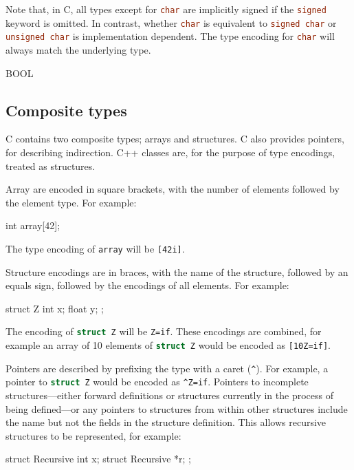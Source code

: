 \documentclass[a4paper]{report}
\newcommand{\ccode}[1]{\lstinline[language={C}]{#1}}
\begin{document}
Note that, in C, all types except for \ccode{char} are implicitly signed if the \ccode{signed} keyword is omitted.
In contrast, whether \ccode{char} is equivalent to \ccode{signed char} or \ccode{unsigned char} is implementation dependent.
The type encoding for \ccode{char} will always match the underlying type.

BOOL

\subsection{Composite types}

C contains two composite types; arrays and structures.
C also provides pointers, for describing indirection.
C++ classes are, for the purpose of type encodings, treated as structures.

Array are encoded in square brackets, with the number of elements followed by the element type.
For example:

\begin{codesnippet}
int array[42];
\end{codesnippet}

The type encoding of \ccode{array} will be \texttt{[42i]}.

Structure encodings are in braces, with the name of the structure, followed by an equals sign, followed by the encodings of all elements.
For example:

\begin{codesnippet}
struct Z
{
	int x;
	float y;
};
\end{codesnippet}

The encoding of \ccode{struct Z} will be \texttt{{Z=if}}.
These encodings are combined, for example an array of 10 elements of \ccode{struct Z} would be encoded as \texttt{[10{Z=if}]}.

Pointers are described by prefixing the type with a caret (\texttt{\^{}}).
For example, a pointer to \ccode{struct Z} would be encoded as \texttt{\^{}{Z=if}}.
Pointers to incomplete structures---either forward definitions or structures currently in the process of being defined---or any pointers to structures from within other structures include the name but not the fields in the structure definition.
This allows recursive structures to be represented, for example:

\begin{codesnippet}
struct Recursive
{
	int x;
	struct Recursive *r;
};
\end{codesnippet}
\end{document}
